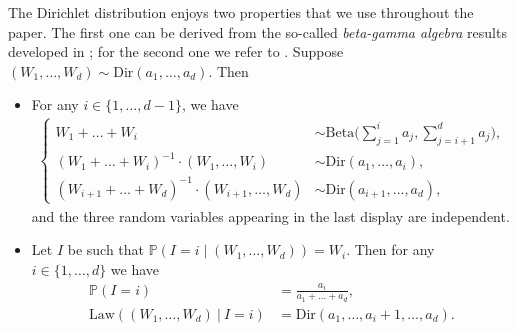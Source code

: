 \documentclass[JEP,XML,SOM,Unicode,NoFloatCountersInSection,published]{cedram}
\newcommand{\Pp}[1]{\mathbb{P} \left(#1\right)}
\newcommand{\Ppsq}[2]{\mathbb{P} \left(#1\mathrel{}\middle|\mathrel{}#2\right)}
\newcommand{\Dir}{\mathrm{Dir}}
\theoremstyle{plain}
\theoremstyle{definition}
\begin{document}
The Dirichlet distribution enjoys two properties that we use throughout the paper.
The first one can be derived from the so-called \emph{beta-gamma algebra} results developed in \cite{dufresne_algebraic_1998}; for the second one we refer to \cite[Lem.\,17]{addario-berry_critical_2010}.
Suppose $(W_1,\dots,W_d) \sim \Dir \left(a_1, \dots, a_d\right)$.
Then
\begin{itemize}
\item For any $i\in\{1,\dots,d-1\}$, we have
\begin{align}\label{eq:dirichlet distrib factorisation}\left\lbrace
\begin{aligned}
W_1+\dots + W_i &\sim \mathrm{Beta} \biggl( \sum_{j=1}^i a_j, \sum_{j=i+1}^d a_j \biggr), \\
(W_1+\dots + W_i)^{-1}\cdot (W_1,\dots ,W_i) &\sim \Dir(a_1, \dots, a_i),\\
(W_{i+1}+\dots + W_d)^{-1}\cdot (W_{i+1},\dots ,W_d) &\sim \Dir(a_{i+1}, \dots, a_d),
\end{aligned}
\right.
\end{align}
and the three random variables appearing in the last display are independent.
\item Let $I$ be such that $\Ppsq{I=i}{(W_1,\dots,W_d)}=W_i$. Then for any $i\in \{1,\dots,d\}$ we have
\begin{align}\label{eq:dirichlet distrib size-biaising}
\Pp{I=i} &= \frac{a_i}{a_1+\dots+a_d},\\
\mathrm{Law}\left((W_1,\dots,W_d) \ \vert \ I=i \right) &= \Dir \left(a_1, \dots,a_i+1,\dots, a_d\right). \label{eq:dirichlet distrib size-biaising_bis}
\end{align}
\end{itemize}
\end{document}

